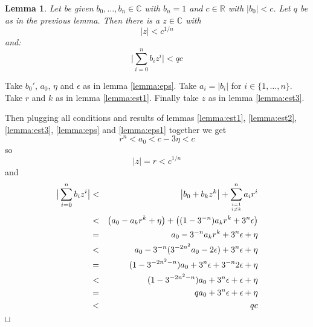 \documentclass{article}
\def\RR{\mathbb{R}}
\def\CC{\mathbb{C}}
\newtheorem{lemma}{Lemma}
\newenvironment{proof}{\trivlist \item[\hskip \labelsep{\bf Proof$\,$}]}{\hfill\rlap{$\sqcap$}$\sqcup$\par}
\begin{document}
\begin{lemma}\label{lemma:key}
Let be given $b_0,\ldots,b_n\in\CC$ with $b_n = 1$ and $c\in\RR$ with $|b_0| < c$.
Let $q$ be as in the previous lemma.  Then there is a $z\in\CC$ with
$$|z| < c^{1/n}$$
and:
$$\big|\sum_{i=0}^n b_i z^i\big| < qc$$
\end{lemma}
\begin{proof}
Take $b_0'$, $a_0$, $\eta$ and $\epsilon$ as in lemma \ref{lemma:eps}.  Take $a_i = |b_i|$
for $i\in\{1,\ldots,n\}$.
Take $r$ and $k$ as in lemma \ref{lemma:est1}.  Finally take $z$ as in lemma \ref{lemma:est3}.

Then plugging all conditions and results of lemmas \ref{lemma:est1}, \ref{lemma:est2}, \ref{lemma:est3},
\ref{lemma:eps} and \ref{lemma:eps1} together we get
$$r^n < a_0 < c - 3\eta < c$$
so
$$|z| = r < c^{1/n}$$
and
\begin{eqnarray*}
\big|\sum_{i=0}^n b_i z^i\big| &<& \left|b_0 + b_k z^k\right| + \sum_{i=1\atop i\ne k}^n a_i r^i\\
&<& \left(a_0 - a_k r^k + \eta\right) + \left((1 - 3^{-n}) a_k r^k + 3^n\epsilon\right)\\
&=& a_0 - 3^{-n} a_k r^k + 3^n\epsilon + \eta\\
&<& a_0 - 3^{-n} (3^{-2n^2} a_0 - 2\epsilon) + 3^n\epsilon + \eta\\
&=& (1 - 3^{-2n^2-n}) a_0 + 3^n\epsilon + 3^{-n} 2\epsilon +\eta\\
&<& (1 - 3^{-2n^2-n}) a_0 + 3^n\epsilon + \epsilon + \eta\\
&=& q a_0 + 3^n\epsilon + \epsilon + \eta\\
&<& q c
\end{eqnarray*}
\end{proof}
\end{document}
